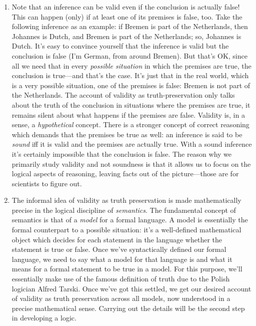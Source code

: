 \begin{enumerate}[\thesection.1]
	\item Note that an inference can be valid even if the conclusion is actually false! This can happen (only) if at least one of its premises is false, too. Take the following inference as an example: if Bremen is part of the Netherlands, then Johannes is Dutch, and Bremen is part of the Netherlands; so, Johannes is Dutch. It's easy to convince yourself that the inference is valid but the conclusion is false (I'm German, from around Bremen). But that's OK, since all we need that in every \emph{possible situation} in which the premises are true, the conclusion is true---and that's the case. It's just that in the real world, which is a very possible situation, one of the premises is false: Bremen is not part of the Netherlands. The account of validity as truth-preservation only talks about the truth of the conclusion in situations where the premises are true, it remains silent about what happens if the premises are false. Validity is, in a sense, a \emph{hypothetical} concept. There is a stronger concept of correct reasoning which demands that the premises be true as well: an inference is said to be \emph{sound} iff it is valid and the premises are actually true. With a sound inference it's certainly impossible that the conclusion is false. The reason why we primarily study validity and not soundness is that it allows us to focus on the logical aspects of reasoning, leaving facts out of the picture---those are for scientists to figure out.
	
	\item The informal idea of validity as truth preservation is made mathematically precise in the logical discipline of \emph{semantics}. The fundamental concept of semantics is that of a \emph{model} for a formal language. A model is essentially the formal counterpart to a possible situation: it's a well-defined mathematical object which decides for each statement in the language whether the statement is true or false. Once we've syntactically defined our formal language, we need to say what a model for that language is and what it means for a formal statement to be true in a model. For this purpose, we'll essentially make use of the famous definition of truth due to the Polish logician Alfred Tarski. Once we've got this settled, we get our desired account of validity as truth preservation across all models, now understood in a precise mathematical sense. Carrying out the details will be the second step in developing a logic. 
		

\end{enumerate}

